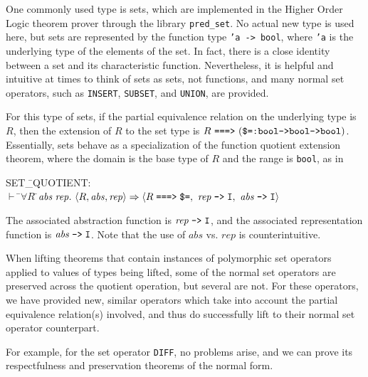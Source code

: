 \documentclass[envcountsame,runningheads]{llncs}
\begin{document}
One commonly used type is sets, which are implemented in the Higher
Order Logic theorem prover through the library {\tt pred\_set}.  No actual
new type is used here, but sets are represented by the function type
{\tt 'a -> bool}, where {\tt 'a} is the underlying type of the elements
of the set.
In fact, there is a close identity between a set and its characteristic
function.  Nevertheless, it is helpful and intuitive at times to think
of sets as sets, not functions, and many normal set operators, such
as {\tt INSERT}, {\tt SUBSET}, and {\tt UNION}, are provided.

For this type of sets,
if the partial equivalence relation
on the underlying type is $R$, then
the extension of $R$
to the set type is
$R \ \mbox{\tt ===>} \ (\mbox{\tt \$=:bool->bool->bool})$.
Essentially, sets behave as a specialization of the
function quotient extension theorem, where the domain is the base type of $R$
and the range is {\tt bool}, as in
{\tt \begin{tabbing}
SET\=\_QUOTIENT: \\
\>  $\vdash$  \=$\forall R\;$\=${\it abs}\;{\it rep}.\ 
          \langle R,{\it abs},{\it rep} \rangle \Rightarrow 
          \langle R\;\mbox{\tt ===>}\;\mbox{\tt \$=},\ 
            {\it rep}\;\mbox{\tt -->}\;{\tt I},\ 
            {\it abs}\;\mbox{\tt -->}\;{\tt I}
          \rangle$ 
\end{tabbing}}
The associated abstraction function
is ${\it rep}\;\mbox{\tt -->}\;{\tt I}$,
and the associated representation function
is ${\it abs}\;\mbox{\tt -->}\;{\tt I}$.
Note that the use of $abs$ vs. $rep$ is counterintuitive.

When lifting theorems that contain instances of polymorphic set operators
applied to values of types being lifted, some of the normal set
operators are preserved across the quotient operation, but several are
not.  For these operators, we have provided new, similar operators
which take into account the partial equivalence relation(s) involved,
and thus do successfully lift to their normal set operator counterpart.

For example, for the set operator {\tt DIFF}, no problems arise, and
we can prove its respectfulness and preservation theorems of the normal
form.
\end{document}
